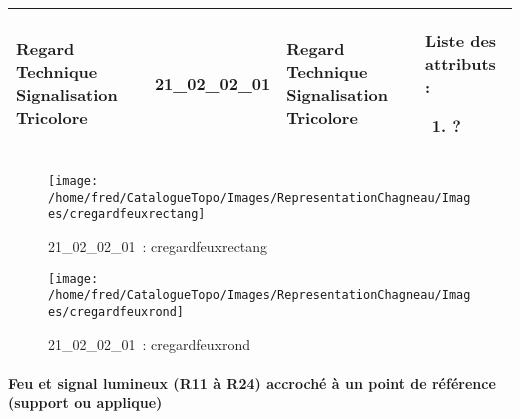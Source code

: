\documentclass[12pt,titlepage]{book}
\begin{document}
\renewcommand{\arraystretch}{1.2}
\begin{supertabular}{|p{10cm}|c|p{13cm}|p{12cm}|}
 Regard Technique Signalisation Tricolore & 21\_02\_02\_01 & Regard Technique Signalisation Tricolore & Liste des attributs :
\begin{enumerate}
  \item ?\end{enumerate}
\\
\hline
\end{supertabular}
\begin{figure}[h!]
  \hfill         %
  \begin{minipage}[t]{3cm}
    \begin{center}
      \texttt{[image: /home/fred/CatalogueTopo/Images/RepresentationChagneau/Images/cregardfeuxrectang]}
      \caption[~21\_02\_02\_01]{\small{21\_02\_02\_01~:} \tiny{cregardfeuxrectang}}\label{cregardfeuxrectang}
    \end{center}
  \end{minipage}
  \begin{minipage}[t]{3cm}
    \begin{center}
      \texttt{[image: /home/fred/CatalogueTopo/Images/RepresentationChagneau/Images/cregardfeuxrond]}
      \caption[~21\_02\_02\_01]{\small{21\_02\_02\_01~:} \tiny{cregardfeuxrond}}\label{cregardfeuxrond}
    \end{center}
  \end{minipage}
\end{figure}


\paragraph{Feu et signal lumineux (R11 à R24) accroché à un point de référence (support ou applique)}
\noindent
\vspace{\baselineskip}
\end{document}
